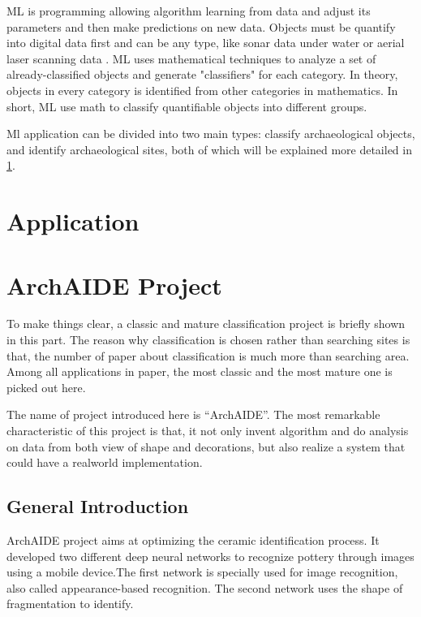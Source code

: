 \documentclass[journal]{IEEEtran}
\begin{document}
	ML is programming allowing algorithm learning from data and adjust its parameters and then make predictions on new data. Objects must be quantify into digital data first and can be any type, like sonar data under water\cite{Drap2018UnderwaterPF} or aerial
	laser scanning data \cite{rs10020225}. ML uses mathematical techniques to analyze a set of already-classified objects and generate "classifiers" for each category. In theory, objects in every category is identified from other categories in mathematics. In short, ML use math to classify quantifiable objects into different groups.\cite{bickler_2021}
	
	Ml application can be divided into two main types: classify archaeological objects, and identify archaeological sites, both of which will be explained more detailed in \ref{application}.

	
	
	\section{Application}\label{application}
	
	\section{ArchAIDE Project}\label{example}
	
	To make things clear, a classic and mature classification project is briefly shown in this part. The reason why classification is chosen rather than searching sites is that, the number of paper about classification is much more than searching area. Among all applications in paper, the most classic and the most mature one is picked out here. 
	
	The name of project introduced here is ``ArchAIDE''. The most remarkable characteristic of this project is that, it not only invent algorithm and do analysis on data from both view of shape and decorations, but also realize a system that could have a realworld implementation. 
	
	\subsection{General Introduction}
	
	ArchAIDE project aims at optimizing the ceramic identification process. It developed two different deep neural networks to recognize pottery through images using a mobile device.The first network is specially used for image recognition, also called appearance-based recognition. The second network uses the shape of fragmentation to identify. 
	
\end{document}
